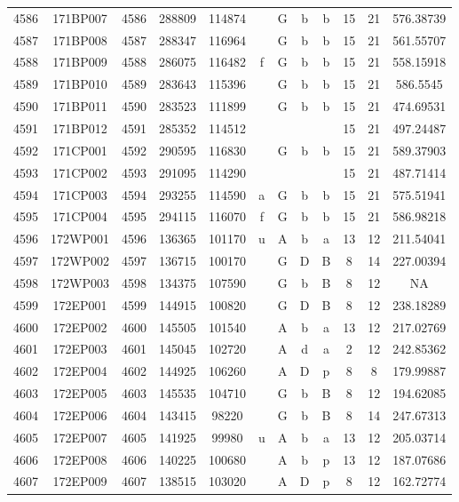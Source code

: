 \begin{tabular}{|*{12}{c|}}
4586 & 171BP007 & 4586 & 288809 & 114874 &  & G & b & b & 15 & 21 & 576.38739 \\ 
4587 & 171BP008 & 4587 & 288347 & 116964 &  & G & b & b & 15 & 21 & 561.55707 \\ 
4588 & 171BP009 & 4588 & 286075 & 116482 & f & G & b & b & 15 & 21 & 558.15918 \\ 
4589 & 171BP010 & 4589 & 283643 & 115396 &  & G & b & b & 15 & 21 & 586.5545 \\ 
4590 & 171BP011 & 4590 & 283523 & 111899 &  & G & b & b & 15 & 21 & 474.69531 \\ 
4591 & 171BP012 & 4591 & 285352 & 114512 &  &  &  &  & 15 & 21 & 497.24487 \\ 
4592 & 171CP001 & 4592 & 290595 & 116830 &  & G & b & b & 15 & 21 & 589.37903 \\ 
4593 & 171CP002 & 4593 & 291095 & 114290 &  &  &  &  & 15 & 21 & 487.71414 \\ 
4594 & 171CP003 & 4594 & 293255 & 114590 & a & G & b & b & 15 & 21 & 575.51941 \\ 
4595 & 171CP004 & 4595 & 294115 & 116070 & f & G & b & b & 15 & 21 & 586.98218 \\ 
4596 & 172WP001 & 4596 & 136365 & 101170 & u & A & b & a & 13 & 12 & 211.54041 \\ 
4597 & 172WP002 & 4597 & 136715 & 100170 &  & G & D & B & 8 & 14 & 227.00394 \\ 
4598 & 172WP003 & 4598 & 134375 & 107590 &  & G & b & B & 8 & 12 & NA \\ 
4599 & 172EP001 & 4599 & 144915 & 100820 &  & G & D & B & 8 & 12 & 238.18289 \\ 
4600 & 172EP002 & 4600 & 145505 & 101540 &  & A & b & a & 13 & 12 & 217.02769 \\ 
4601 & 172EP003 & 4601 & 145045 & 102720 &  & A & d & a & 2 & 12 & 242.85362 \\ 
4602 & 172EP004 & 4602 & 144925 & 106260 &  & A & D & p & 8 & 8 & 179.99887 \\ 
4603 & 172EP005 & 4603 & 145535 & 104710 &  & G & b & B & 8 & 12 & 194.62085 \\ 
4604 & 172EP006 & 4604 & 143415 & 98220 &  & G & b & B & 8 & 14 & 247.67313 \\ 
4605 & 172EP007 & 4605 & 141925 & 99980 & u & A & b & a & 13 & 12 & 205.03714 \\ 
4606 & 172EP008 & 4606 & 140225 & 100680 &  & A & b & p & 13 & 12 & 187.07686 \\ 
4607 & 172EP009 & 4607 & 138515 & 103020 &  & A & D & p & 8 & 12 & 162.72774 \\ 

\end{tabular}
